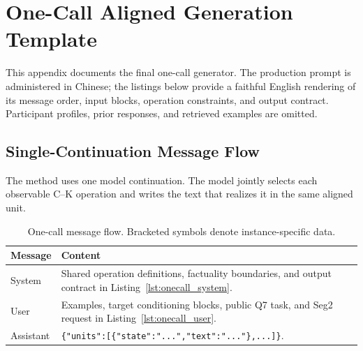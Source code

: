 \section{One-Call Aligned Generation Template}
\label{app:r2_templates}

This appendix documents the final one-call generator. The production prompt
is administered in Chinese; the listings below provide a faithful English
rendering of its message order, input blocks, operation constraints, and
output contract. Participant profiles, prior responses, and retrieved
examples are omitted.

\subsection{Single-Continuation Message Flow}

The method uses one model continuation. The model jointly selects each
observable C--K operation and writes the text that realizes it in the same
aligned unit.

\begin{table}[t]
\centering
\small
\caption{One-call message flow. Bracketed symbols denote instance-specific
data.}
\label{tab:onecall_message_flow}
\begin{tabular}{p{} p{}}
\toprule
\textbf{Message} & \textbf{Content} \\
\midrule
System & Shared operation definitions, factuality boundaries, and output
contract in Listing~\ref{lst:onecall_system}. \\
User & Examples, target conditioning blocks, public Q7 task, and Seg2 request
in Listing~\ref{lst:onecall_user}. \\
Assistant & \texttt{\{"units":[\{"state":"...","text":"..."\},...]\}}. \\
\bottomrule
\end{tabular}
\end{table}

